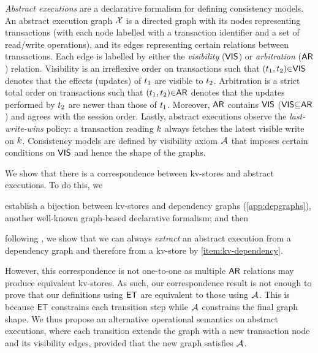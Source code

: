 

\emph{Abstract executions} \cite{ev_transactions,framework-concur} are a declarative formalism for defining consistency models. 
An abstract execution graph $\mathcal{X}$ is a directed graph with its nodes representing transactions 
(with each node labelled with a transaction identifier and a set of read/write operations), 
and its edges representing certain relations between transactions. 
Each edge is labelled by either the \emph{visibility} ($\mathsf{VIS}$) or \emph{arbitration} ($\mathsf{AR}$) relation. 
Visibility is an irreflexive order on transactions such that $(t_1,t_2) {\in} \mathsf{VIS}$ denotes that the effects (updates) of $t_1$ are visible to $t_2$. 
Arbitration is a strict total order on transactions such that $(t_1,t_2) {\in} \mathsf{AR}$ denotes that the updates performed by $t_2$ are newer than those of $t_1$. 
Moreover, $\mathsf{AR}$ contains $\mathsf{VIS}$ ($\mathsf{VIS} {\subseteq} \mathsf{AR}$) and agrees with the session order.
Lastly, abstract executions observe the \emph{last-write-wins} policy: 
a transaction reading $k$ always fetches the latest visible write on $k$.
Consistency models are defined by visibility axiom \( \visaxioms\) 
that imposes certain conditions on $\mathsf{VIS}$ and hence the shape of the graphs.

We show that there is a correspondence between kv-stores and abstract executions.
To do this, we 
\begin{enumerate*}
	\item establish a bijection between kv-stores and dependency graphs (\cref{app:depgraphs}),
	\label{item:kv-dependency}
another well-known graph-based declarative formalism; and then
	\item following \cite{laws}, we show that we can always \emph{extract} an abstract execution from a dependency graph and therefore from a kv-store by \ref{item:kv-dependency}. 
\end{enumerate*}
However, this correspondence is not one-to-one 
as multiple $\mathsf{AR}$ relations may produce equivalent kv-stores.
As such, our correspondence result is not enough to prove that 
our definitions using \( \mathsf{ET} \) are equivalent to those using \( \visaxioms \).
This is because \( \mathsf{ET} \) constrains each transition step while \( \visaxioms\) constrains the final graph shape.
We thus propose an alternative operational semantics on abstract executions,
where each transition extends the graph with a 
new transaction node and its visibility edges, 
provided that the new graph satisfies \( \visaxioms \).

